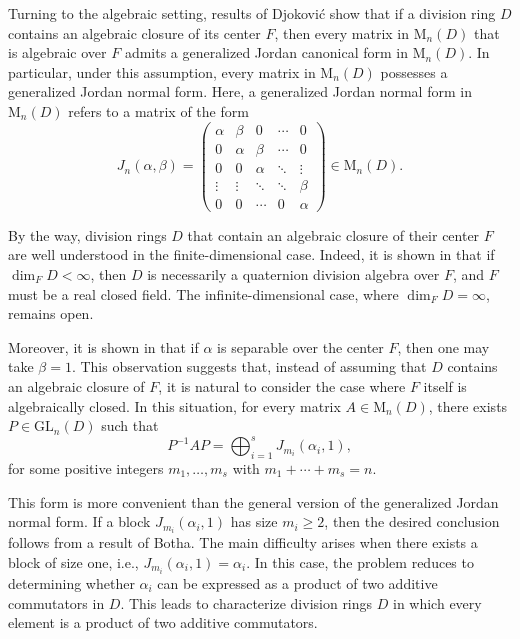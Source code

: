 \documentclass[11pt]{article}
\theoremstyle{definition}
\begin{document}
{{{{			Turning to the algebraic setting, results of Djokovi\'c \cite[Proposition~6 and Theorem~7]{Pa_Dra_85} show that if a division ring \( D \) contains an algebraic closure of its center \( F \), then every matrix in \( \mathrm{M}_n(D) \) that is algebraic over \( F \) admits a generalized Jordan canonical form in \( \mathrm{M}_n(D) \). In particular, under this assumption, every matrix in \( \mathrm{M}_n(D) \) possesses a generalized Jordan normal form. Here, a generalized Jordan normal form in \( \mathrm{M}_n(D) \) refers to a matrix of the form
			\[
			J_{n}(\alpha,\beta) =
			\begin{pmatrix}
				\alpha & \beta & 0 & \cdots & 0 \\
				0 & \alpha & \beta & \cdots & 0 \\
				0 & 0 & \alpha & \ddots & \vdots \\
				\vdots & \vdots & \ddots & \ddots & \beta \\
				0 & 0 & \cdots & 0 & \alpha
			\end{pmatrix}
			\in \mathrm{M}_n(D).
			\]
			
			
			By the way, division rings \( D \) that contain an algebraic closure of their center \( F \) are well understood in the finite-dimensional case. Indeed, it is shown in \cite[(15.9) Theorem, Page 243]{Bo_Lam_91} that  if \( \dim_F D < \infty \), then \( D \) is necessarily a quaternion division algebra over \( F \), and \( F \) must be a real closed field. The infinite-dimensional case, where \( \dim_F D = \infty \), remains open.
			
			
			
			Moreover, it is shown in \cite[Theorem~7]{Pa_Dra_85} that if \( \alpha \) is separable over the center \( F \), then one may take \( \beta = 1 \). This observation suggests that, instead of assuming that \( D \) contains an algebraic closure of \( F \), it is natural to consider the case where \( F \) itself is algebraically closed. In this situation, for every matrix \( A \in \mathrm{M}_n(D) \), there exists \( P \in \mathrm{GL}_n(D) \) such that
			\[
			P^{-1} A P = \bigoplus_{i=1}^s J_{m_i}(\alpha_i,1),
			\]
			for some positive integers \( m_1, \dots, m_s \) with \( m_1 + \cdots + m_s = n \).
			
			This form is more convenient than the general version of the generalized Jordan normal form. If a block \( J_{m_i}(\alpha_i,1) \) has size \( m_i \ge 2 \), then the desired conclusion follows from a result of Botha. The main difficulty arises when there exists a block of size one, i.e., \( J_{m_i}(\alpha_i,1) = \alpha_i \). In this case, the problem reduces to determining whether \( \alpha_i \) can be expressed as a product of two additive commutators in \( D \). 	This leads to  characterize division rings \( D \) in which every element is a product of two additive commutators.
			

}}}}
\end{document}
